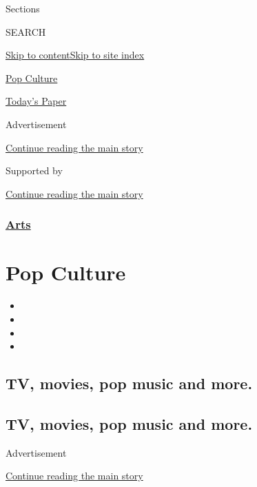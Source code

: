 Sections

SEARCH

\protect\hyperlink{site-content}{Skip to
content}\protect\hyperlink{site-index}{Skip to site index}

\href{https://www.nytimes.com/spotlight/pop-culture}{Pop Culture}

\href{https://myaccount.nytimes.com/auth/login?response_type=cookie\&client_id=vi}{}

\href{https://www.nytimes.com/section/todayspaper}{Today's Paper}

Advertisement

\protect\hyperlink{after-top}{Continue reading the main story}

Supported by

\protect\hyperlink{after-sponsor}{Continue reading the main story}

\hypertarget{arts}{%
\subsubsection{\texorpdfstring{\href{/section/arts}{Arts}}{Arts}}\label{arts}}

\hypertarget{pop-culture}{%
\section{Pop Culture}\label{pop-culture}}

\begin{itemize}
\item
\item
\item
\item
\end{itemize}

\hypertarget{tv-movies-pop-music-and-more}{%
\subsection{TV, movies, pop music and
more.}\label{tv-movies-pop-music-and-more}}

\hypertarget{tv-movies-pop-music-and-more-1}{%
\subsection{TV, movies, pop music and
more.}\label{tv-movies-pop-music-and-more-1}}

Advertisement

\protect\hyperlink{after-subheader}{Continue reading the main story}

